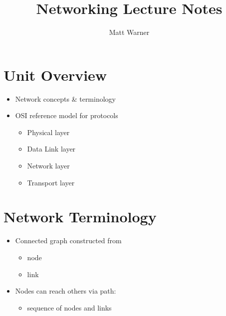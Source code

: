 \documentclass{report}
\title{\Huge{Networking Lecture Notes}}
\author{\huge{Matt Warner}}
\date{\huge{}}
\begin{document}
  \maketitle
  \section{Unit Overview}
  \begin{itemize}
    \item Network concepts \& terminology
    \item OSI reference model for protocols
      \begin{itemize}[label=$\circ$]
        \item Physical layer
        \item Data Link layer
        \item Network layer
        \item Transport layer
      \end{itemize}
  \end{itemize}
  \section{Network Terminology}
\begin{itemize}
  \item Connected graph constructed from
    \begin{itemize}[label=$\circ$]
      \item node
      \item link
    \end{itemize}
  \item Nodes can reach others via path:
    \begin{itemize}[label=$\circ$]
      \item sequence of nodes and links
    \end{itemize}
\end{itemize}
\end{document}

